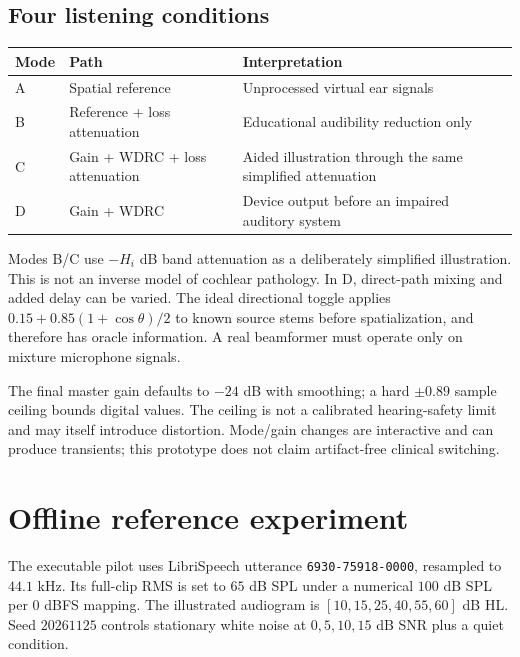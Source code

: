 \documentclass[11pt,a4paper]{article}
\newcommand{\code}[1]{\texttt{#1}}
\begin{document}
\subsection{Four listening conditions}
\begin{tabularx}{\linewidth}{@{}p{.08\linewidth}p{.26\linewidth}Y@{}}\toprule
Mode & Path & Interpretation\\\midrule
A & Spatial reference & Unprocessed virtual ear signals\\
B & Reference + loss attenuation & Educational audibility reduction only\\
C & Gain + WDRC + loss attenuation & Aided illustration through the same simplified attenuation\\
D & Gain + WDRC & Device output before an impaired auditory system\\\bottomrule
\end{tabularx}

Modes B/C use $-H_i$ dB band attenuation as a deliberately simplified illustration. This is not an inverse model of cochlear pathology. In D, direct-path mixing and added delay can be varied. The ideal directional toggle applies $0.15+0.85(1+\cos\theta)/2$ to known source stems before spatialization, and therefore has oracle information. A real beamformer must operate only on mixture microphone signals.

The final master gain defaults to $-24$ dB with smoothing; a hard $\pm0.89$ sample ceiling bounds digital values. The ceiling is not a calibrated hearing-safety limit and may itself introduce distortion. Mode/gain changes are interactive and can produce transients; this prototype does not claim artifact-free clinical switching.

\section{Offline reference experiment}
The executable pilot uses LibriSpeech utterance \code{6930-75918-0000}, resampled to $44.1$ kHz. Its full-clip RMS is set to $65$ dB SPL under a numerical $100$ dB SPL per $0$ dBFS mapping. The illustrated audiogram is $[10,15,25,40,55,60]$ dB HL. Seed $20261125$ controls stationary white noise at $0,5,10,15$ dB SNR plus a quiet condition.
\end{document}

